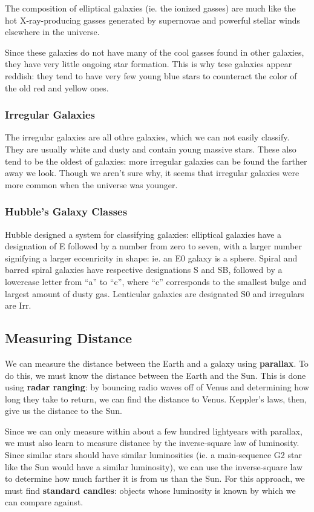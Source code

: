 \documentclass[12pt]{article}
\begin{document}
The composition of elliptical galaxies (ie. the ionized gasses) are much like the hot X-ray-producing gasses generated by supernovae and powerful stellar winds elsewhere in the universe.

Since these galaxies do not have many of the cool gasses found in other galaxies, they have very little ongoing star formation. This is why tese galaxies appear reddish: they tend to have very few young blue stars to counteract the color of the old red and yellow ones.

\subsubsection{Irregular Galaxies}
The irregular galaxies are all othre galaxies, which we can not easily classify. They are usually white and dusty and contain young massive stars. These also tend to be the oldest of galaxies: more irregular galaxies can be found the farther away we look. Though we aren't sure why, it seems that irregular galaxies were more common when the universe was younger.

\subsubsection{Hubble's Galaxy Classes}
Hubble designed a system for classifying galaxies: elliptical galaxies have a designation of E followed by a number from zero to seven, with a larger number signifying a larger eccenricity in shape: ie. an E0 galaxy is a sphere. Spiral and barred spiral galaxies have respective designations S and SB, followed by a lowercase letter from ``a'' to ``c'', where ``c'' corresponds to the smallest bulge and largest amount of dusty gas. Lenticular galaxies are designated S0 and irregulars are Irr.

\subsection{Measuring Distance}
We can measure the distance between the Earth and a galaxy using {\bf parallax}. To do this, we must know the distance between the Earth and the Sun. This is done using {\bf radar ranging}: by bouncing radio waves off of Venus and determining how long they take to return, we can find the distance to Venus. Keppler's laws, then, give us the distance to the Sun.

Since we can only measure within about a few hundred lightyears with parallax, we must also learn to measure distance by the inverse-square law of luminosity. Since similar stars should have similar luminosities (ie. a main-sequence G2 star like the Sun would have a similar luminosity), we can use the inverse-square law to determine how much farther it is from us than the Sun. For this approach, we must find {\bf standard candles}: objects whose luminosity is known by which we can compare against.
\end{document}
